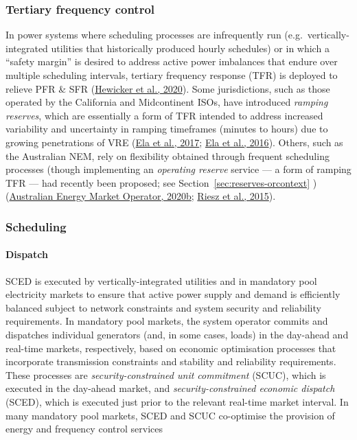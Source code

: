 \documentclass[12pt,a4paper,]{report}
\begin{document}
\hypertarget{tertiary-frequency-control}{%
\subsubsection{Tertiary frequency
control}\label{tertiary-frequency-control}}

In power systems where scheduling processes are infrequently run
(e.g.~vertically-integrated utilities that historically produced hourly
schedules) or in which a ``safety margin'' is desired to address active
power imbalances that endure over multiple scheduling intervals,
tertiary frequency response (TFR) is deployed to relieve PFR \& SFR
(\protect\hyperlink{ref-hewickerDimensioningControlReserves2020}{Hewicker
et al., 2020}). Some jurisdictions, such as those operated by the
California and Midcontinent ISOs, have introduced \emph{ramping
reserves}, which are essentially a form of TFR intended to address
increased variability and uncertainty in ramping timeframes (minutes to
hours) due to growing penetrations of VRE
(\protect\hyperlink{ref-elaElectricityMarketsRenewables2017}{Ela et al.,
2017}; \protect\hyperlink{ref-elaWholesaleElectricityMarket2016}{Ela et
al., 2016}). Others, such as the Australian NEM, rely on flexibility
obtained through frequent scheduling processes (though implementing an
\emph{operating reserve} service --- a form of ramping TFR --- had
recently been proposed; see Section~\ref{sec:reserves-orcontext} )
(\protect\hyperlink{ref-australianenergymarketoperatorPowerSystemRequirements2020}{Australian
Energy Market Operator, 2020b};
\protect\hyperlink{ref-rieszFrequencyControlAncillary2015}{Riesz et al.,
2015}).

\hypertarget{sec:lit_review-balancing_practices-scheduling}{%
\subsubsection{Scheduling}\label{sec:lit_review-balancing_practices-scheduling}}

\hypertarget{dispatch}{%
\paragraph{Dispatch}\label{dispatch}}

SCED is executed by vertically-integrated utilities and in mandatory
pool electricity markets to ensure that active power supply and demand
is efficiently balanced subject to network constraints and system
security and reliability requirements. In mandatory pool markets, the
system operator commits and dispatches individual generators (and, in
some cases, loads) in the day-ahead and real-time markets, respectively,
based on economic optimisation processes that incorporate transmission
constraints and stability and reliability requirements. These processes
are \emph{security-constrained unit commitment} (SCUC), which is
executed in the day-ahead market, and \emph{security-constrained
economic dispatch} (SCED), which is executed just prior to the relevant
real-time market interval. In many mandatory pool markets, SCED and SCUC
co-optimise the provision of energy and frequency control services
\end{document}
